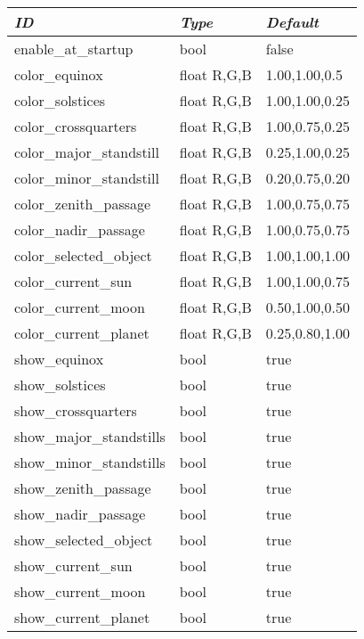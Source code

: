 \begin{longtabu} {l|l|l}\toprule
\emph{ID}                   &\emph{Type} & \emph{Default}  \\\midrule
enable\_at\_startup         &bool        & false           \\\midrule
color\_equinox              &float R,G,B & 1.00,1.00,0.5   \\\midrule
color\_solstices            &float R,G,B & 1.00,1.00,0.25  \\\midrule
color\_crossquarters        &float R,G,B & 1.00,0.75,0.25  \\\midrule
color\_major\_standstill    &float R,G,B & 0.25,1.00,0.25  \\\midrule
color\_minor\_standstill    &float R,G,B & 0.20,0.75,0.20  \\\midrule
color\_zenith\_passage      &float R,G,B & 1.00,0.75,0.75  \\\midrule
color\_nadir\_passage       &float R,G,B & 1.00,0.75,0.75  \\\midrule
color\_selected\_object     &float R,G,B & 1.00,1.00,1.00  \\\midrule
color\_current\_sun         &float R,G,B & 1.00,1.00,0.75  \\\midrule
color\_current\_moon        &float R,G,B & 0.50,1.00,0.50  \\\midrule
color\_current\_planet      &float R,G,B & 0.25,0.80,1.00  \\\midrule
show\_equinox               &bool        & true  \\\midrule
show\_solstices             &bool        & true  \\\midrule
show\_crossquarters         &bool        & true  \\\midrule
show\_major\_standstills    &bool        & true  \\\midrule
show\_minor\_standstills    &bool        & true  \\\midrule
show\_zenith\_passage       &bool        & true  \\\midrule
show\_nadir\_passage        &bool        & true  \\\midrule
show\_selected\_object      &bool        & true  \\\midrule
show\_current\_sun          &bool        & true  \\\midrule
show\_current\_moon         &bool        & true  \\\midrule
show\_current\_planet       &bool        & true  \\\bottomrule
\end{longtabu}


